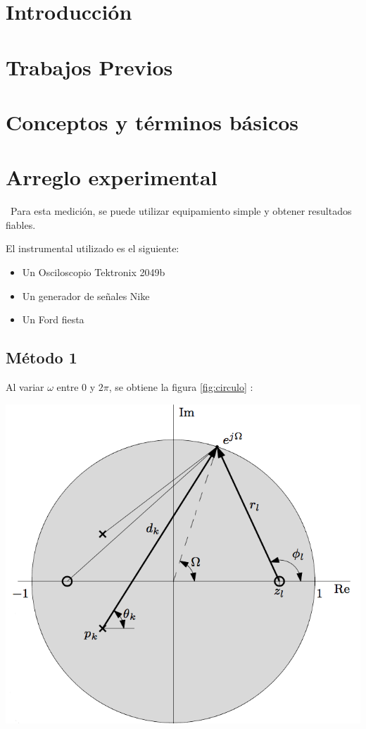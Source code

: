 \documentclass[]{article}
\makeatletter
\newenvironment{figurehere}   %
  {\def\@captype{figure}}   %
  {\par\medskip}
  {}              %
\makeatother
\begin{document}
\begin{multicols}{2}
\section{Introducción}
\lipsum[2]
\section{Trabajos Previos}
\lipsum[3]
\section{Conceptos y términos básicos}
\lipsum[4]
\section{Arreglo experimental}
\lipsum[5]
\
Para esta medición, se puede utilizar equipamiento simple y obtener resultados fiables.

El instrumental utilizado es el siguiente:
\begin{itemize}
  \item Un Osciloscopio Tektronix 2049b
  \item Un generador de señales Nike
  \item Un Ford fiesta
\end{itemize}
\subsection{Método 1}
\lipsum[6]
Al variar $\omega$ entre $0$ y $2 \pi$, se obtiene la figura \ref{fig:circulo} :

\begin{figurehere}
 \centering
 \includegraphics[width=\linewidth]{lathi}
 \label{fig:circulo}
\end{figurehere}


\end{multicols}
\end{document}
